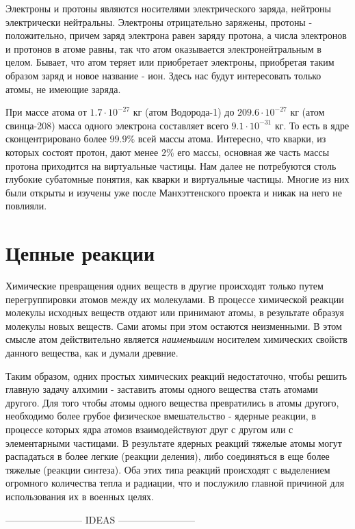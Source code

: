 Электроны и протоны являются носителями электрического заряда, нейтроны электрически нейтральны. 
Электроны отрицательно заряжены, протоны - положительно, причем заряд электрона равен заряду протона, а числа электронов и протонов в атоме равны, так что атом оказывается электронейтральным в целом.
Бывает, что атом теряет или приобретает электроны, приобретая таким образом заряд и новое название - ион.
Здесь нас будут интересовать только атомы, не имеющие заряда.

При массе атома от $1.7\cdot 10^{-27}$ кг (атом Водорода-1) до $209.6\cdot 10^{-27}$ кг (атом свинца-208) масса одного электрона составляет всего $9.1\cdot 10^{-31}$ кг.
То есть в ядре сконцентрировано более $99.9\%$ всей массы атома.
Интересно, что кварки, из которых состоят протон, дают менее $2\%$ его массы, основная же часть массы протона приходится на виртуальные частицы.
Нам далее не потребуются столь глубокие субатомные понятия, как кварки и виртуальные частицы. 
Многие из них были открыты и изучены уже после Манхэттенского проекта и никак на него не повлияли. 


\section*{Цепные реакции}

Химические превращения одних веществ в другие происходят только путем перегруппировки атомов между их молекулами.
В процессе химической реакции молекулы исходных веществ отдают или принимают атомы, в результате образуя молекулы новых веществ. 
Сами атомы при этом остаются неизменными.
В этом смысле атом действительно является \textit{наименьшим} носителем химических свойств данного вещества, как и думали древние.

Таким образом, одних простых химических реакций недостаточно, чтобы решить главную задачу алхимии - заставить атомы одного вещества стать атомами другого.
Для того чтобы атомы одного вещества превратились в атомы другого, необходимо более грубое физическое вмешательство - ядерные реакции, в процессе которых ядра атомов взаимодействуют друг с другом или с элементарными частицами.
В результате ядерных реакций тяжелые атомы могут распадаться в более легкие (реакции деления), либо соединяться в еще более тяжелые (реакции синтеза).
Оба этих типа реакций происходят с выделением огромного количества тепла и радиации, что и послужило главной причиной для использования их в военных целях.




------------------------ IDEAS ------------------------ 

